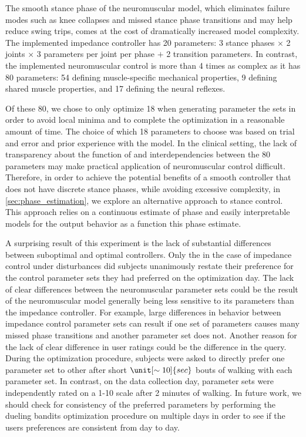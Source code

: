 The smooth stance phase of the neuromuscular model, which eliminates failure
modes such as knee collapses and missed stance phase transitions and may help
reduce swing trips, comes at the cost of dramatically increased model
complexity. The implemented impedance controller has 20 parameters: 3 stance
phases $\times$ 2 joints $\times$ 3 parameters per joint per phase $+$ 2
transition parameters. In contrast, the implemented neuromuscular control is
more than 4 times as complex as it has 80 parameters: 54 defining
muscle-specific mechanical properties, 9 defining shared muscle properties, and
17 defining the neural reflexes. 

Of these 80, we chose to only optimize 18 when generating parameter the sets in
order to avoid local minima and to complete the optimization in a reasonable
amount of time. The choice of which 18 parameters to choose was based on trial
and error and prior experience with the model. In the clinical setting, the lack
of transparency about the function of and interdependencies between the 80
parameters may make practical application of neuromuscular control difficult.
Therefore, in order to achieve the potential benefits of a smooth controller
that does not have discrete stance phases, while avoiding excessive complexity,
in \cref{sec:phase_estimation}, we explore an alternative approach to stance
control. This approach relies on a continuous estimate of phase and easily
interpretable models for the output behavior as a function this phase estimate.

A surprising result of this experiment is the lack of substantial differences
between suboptimal and optimal controllers. Only the in the case of impedance
control under disturbances did subjects unanimously restate their preference for
the control parameter sets they had preferred on the optimization day. The lack
of clear differences between the neuromuscular parameter sets could be the
result of the neuromuscular model generally being less sensitive to its
parameters than the impedance controller. For example, large differences in
behavior between impedance control parameter sets can result if one set of
parameters causes many missed phase transitions and another parameter set does
not. Another reason for the lack of clear difference in user ratings could be
the difference in the query. During the optimization procedure, subjects were
asked to directly prefer one parameter set to other after short
$\unit[\sim10]{sec}$ bouts of walking with each parameter set. In contrast, on
the data collection day, parameter sets were independently rated on a 1-10 scale
after 2 minutes of walking. In future work, we should check for consistency of
the preferred parameters by performing the dueling bandits optimization
procedure on multiple days in order to see if the users preferences are
consistent from day to day.

